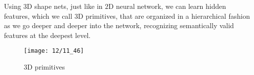 Using $3$D shape nets, just like in $2$D neural network, we can learn hidden features, which we call $3$D primitives, that are organized in a hierarchical fashion as we go deeper and deeper into the network, recognizing semantically valid features at the deepest level.
\begin{figure}[H]
	\centering
	\texttt{[image: 12/11\_46]}
	\caption{$3$D primitives}\label{fig:primitives}	
\end{figure}


